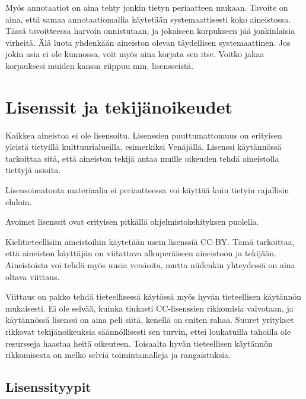 \documentclass[]{book}
\begin{document}
Myös annotaatiot on aina tehty jonkin tietyn periaatteen mukaan. Tavoite
on aina, että samaa annotaatiomallia käytetään systemaattisesti koko
aineistossa. Tässä tavoitteessa harvoin onnistutaan, ja jokaiseen
korpukseen jää jonkinlaisia virheitä. Älä luota yhdenkään aineiston
olevan täydellisen systemaattinen. Jos jokin asia ei ole kunnossa, voit
myös aina korjata sen itse. Voitko jakaa korjauksesi muiden kanssa
riippuu mm. lisensseistä.

\hypertarget{lisenssit-ja-tekijanoikeudet}{%
\section{Lisenssit ja
tekijänoikeudet}\label{lisenssit-ja-tekijanoikeudet}}

Kaikkea aineistoa ei ole lisensoitu. Lisenssien puuttumattomuus on
erityisen yleistä tietyillä kulttuurialueilla, esimerkiksi Venäjällä.
Lisenssi käytännössä tarkoittaa sitä, että aineiston tekijä antaa muille
oikeuden tehdä aineistolla tiettyjä asioita.

Lisensoimatonta materiaalia ei periaatteessa voi käyttää kuin tietyin
rajallisin ehdoin.

Avoimet lisenssit ovat erityisen pitkällä ohjelmistokehityksen puolella.

Kielitieteellisiin aineistoihin käytetään usein lisenssiä CC-BY. Tämä
tarkoittaa, että aineiston käyttäjän on viitattava alkuperäiseen
aineistoon ja tekijään. Aineistoista voi tehdä myös uusia versioita,
mutta niidenkin yhteydessä on aina oltava viittaus.

Viittaus on pakko tehdä tieteellisessä käytössä myös hyvän tieteellisen
käytännön mukaisesti. Ei ole selvää, kuinka tiukasti CC-lisenssien
rikkomisia valvotaan, ja käytännössä lisenssi on aina peli siitä,
kenellä on eniten rahaa. Suuret yritykset rikkovat tekijänoikeuksia
säännöllisesti sen turvin, ettei loukatuilla tahoilla ole resursseja
haastaa heitä oikeuteen. Toisaalta hyvän tieteellisen käytännön
rikkomisesta on melko selviä toimintamalleja ja rangaistuksia.

\hypertarget{lisenssityypit}{%
\subsection{Lisenssityypit}\label{lisenssityypit}}
\end{document}
